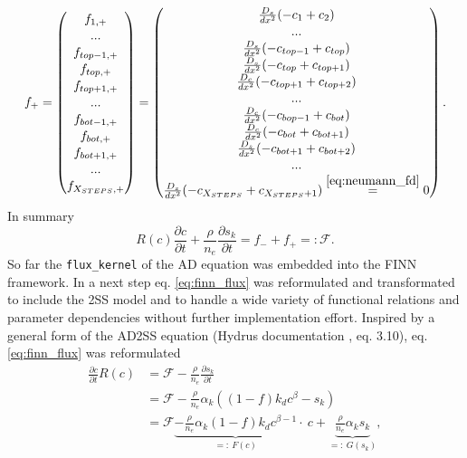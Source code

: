 \begin{equation}
\arraycolsep=1pt\def\arraystretch{1.1}
    f_{+} = \left(\begin{matrix}  f_{1,+}\\ ...\\f_{top-1,+}\\f_{top,+}\\f_{top+1,+}\\...\\f_{bot-1,+}\\f_{bot,+}\\f_{bot+1,+}\\
    ...\\ f_{X_{STEPS},+}\end{matrix}\right)= \left(\begin{matrix}  \frac{D_s}{dx^2}(-c_1+c_2)\\ ...\\\frac{D_s}{dx^2}(-c_{top-1}+c_{top})\\\frac{D_s}{dx^2}(-c_{top}+c_{top+1})\\\frac{D_c}{dx^2}(-c_{top+1}+c_{top+2})\\...\\\frac{D_c}{dx^2}(-c_{bop-1}+c_{bot})\\\frac{D_c}{dx^2}(-c_{bot}+c_{bot+1})\\\frac{D_s}{dx^2}(-c_{bot+1}+c_{bot+2})\\
    ...\\\frac{D_s}{dx^2}(-c_{X_{STEPS}}+c_{X_{STEPS}+1}) \overset{\ref{eq:neumann_fd}}{=} 0\end{matrix}\right).
\end{equation}
In summary
\begin{equation}
    R(c)\frac{\partial c}{\partial t}  + \frac{\rho}{n_e} \frac{\partial s_k}{\partial t}= f_{-} + f_{+} =: \mathcal{F}.
    \label{eq:finn_flux}
\end{equation}
So far the \texttt{flux\_kernel} of the AD equation was embedded into the FINN framework. In a next step eq. \ref{eq:finn_flux} was reformulated and transformated to include the 2SS model and to handle a wide variety of functional relations and parameter dependencies without further implementation effort. Inspired by a general form of the AD2SS equation (Hydrus documentation \cite{Simunek2008Jan}, eq. 3.10), eq. \ref{eq:finn_flux} was reformulated
\begin{align}
    \frac{\partial c}{\partial t}R(c) &= \mathcal{F} - \frac{\rho}{n_e} \frac{\partial s_k}{\partial t}\nonumber\\
    &=  \mathcal{F} - \frac{\rho}{n_e} \alpha_k\left((1-f)k_dc^{\beta}-s_k\right)\nonumber\\
    &= \mathcal{F} \underbrace{- \frac{\rho}{n_e} \alpha_k(1-f)k_dc^{\beta-1}}_{=:\:F(c)}\cdot \: c + \underbrace{ \frac{\rho}{n_e}\alpha_ks_k}_{=: \: G(s_k)},
    \label{eq:Trans}
\end{align}
